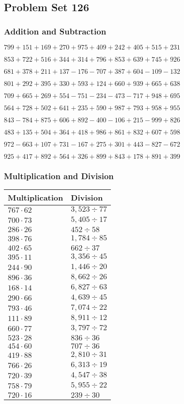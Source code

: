 \hypertarget{problem-set-126}{%
\subsection{Problem Set 126}\label{problem-set-126}}

\hypertarget{addition-and-subtraction}{%
\subsubsection{Addition and
Subtraction}\label{addition-and-subtraction}}

\(799 +151 +169 +270 +975 +409 +242 +405 +515 +231\)

\(853 +722 +516 +344 +314 +796 +853 +639 +745 +926\)

\(681 +378 +211 +137 - 176 - 707 +387 +604 - 109 - 132\)

\(801 +292 +395 +330 +593 +124 +660 +939 +665 +638\)

\(709 +665 +269 +554 - 751 - 234 - 473 - 717 +948 +695\)

\(564 +728 +502 +641 +235 +590 +987 +793 +958 +955\)

\(843 - 784 +875 +606 +892 - 400 - 106 +215 - 999 +826\)

\(483 +135 +504 +364 +418 +986 +861 +832 +607 +598\)

\(972 - 663 +107 +731 - 167 +275 +301 +443 - 827 - 672\)

\(925 +417 +892 +564 +326 +899 +843 +178 +891 +399\)

\hypertarget{multiplication-and-division}{%
\subsubsection{Multiplication and
Division}\label{multiplication-and-division}}

\begin{longtable}[]{@{}ll@{}}
\toprule
Multiplication & Division\tabularnewline
\midrule
\endhead
\(767 \cdot 62\) & \(3,523÷77\)\tabularnewline
\(700 \cdot 73\) & \(5,405÷17\)\tabularnewline
\(286 \cdot 26\) & \(452÷58\)\tabularnewline
\(398 \cdot 76\) & \(1,784÷85\)\tabularnewline
\(402 \cdot 65\) & \(662÷37\)\tabularnewline
\(395 \cdot 11\) & \(3,356÷45\)\tabularnewline
\(244 \cdot 90\) & \(1,446÷20\)\tabularnewline
\(896 \cdot 36\) & \(8,662÷26\)\tabularnewline
\(168 \cdot 14\) & \(6,827÷63\)\tabularnewline
\(290 \cdot 66\) & \(4,639÷45\)\tabularnewline
\(793 \cdot 46\) & \(7,074÷22\)\tabularnewline
\(111 \cdot 89\) & \(8,911÷12\)\tabularnewline
\(660 \cdot 77\) & \(3,797÷72\)\tabularnewline
\(523 \cdot 28\) & \(836÷36\)\tabularnewline
\(454 \cdot 60\) & \(707÷36\)\tabularnewline
\(419 \cdot 88\) & \(2,810 ÷31\)\tabularnewline
\(766 \cdot 26\) & \(6,313÷19\)\tabularnewline
\(720 \cdot 39\) & \(4,547÷38\)\tabularnewline
\(758 \cdot 79\) & \(5,955÷22\)\tabularnewline
\(720 \cdot 16\) & \(239÷30\)\tabularnewline
\bottomrule
\end{longtable}
